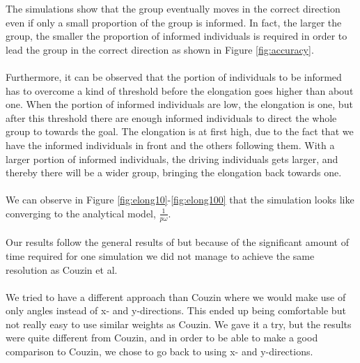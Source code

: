 The simulations show that the group eventually moves in the correct direction even if only a small proportion of the group is informed. 
In fact, the larger the group, the smaller the proportion of informed individuals is required in order to lead the group in the correct direction as shown in Figure \ref{fig:accuracy}.
\\\\
Furthermore, it can be observed that the portion of individuals to be informed has to overcome a kind of threshold before the elongation goes higher than about one. 
When the portion of informed individuals are low, the elongation is one, but after this threshold there are enough informed individuals to direct the whole group to towards the goal. 
The elongation is at first high, due to the fact that we have the informed individuals in front and the others following them. 
With a larger portion of informed individuals, the driving individuals gets larger, and thereby there will be a wider group, bringing the elongation back towards one.
\\\\
We can observe in Figure \ref{fig:elong10}-\ref{fig:elong100} that the simulation looks like converging to the analytical model, $\frac{1}{p\omega}$.
\\\\
Our results follow the general results of \cite{theArticle} but because of the significant amount of time required for one simulation we did not manage to achieve the same resolution as Couzin et al.
\\\\
We tried to have a different approach than Couzin where we would make use of only angles instead of x- and y-directions. 
This ended up being comfortable but not really easy to use similar weights as Couzin. 
We gave it a try, but the results were quite different from Couzin, and in order to be able to make a good comparison to Couzin, we chose to go back to using x- and y-directions.